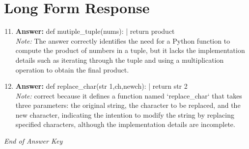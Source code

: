 \documentclass[12pt]{article}
\begin{document}
\section*{Long Form Response}
\begin{enumerate}[label=\arabic*.]
\setcounter{enumi}{10}
\item \textbf{Answer:} def mutiple\_tuple(nums): | return product
\\ \textit{Note:} The answer correctly identifies the need for a Python function to compute the product of numbers in a tuple, but it lacks the implementation details such as iterating through the tuple and using a multiplication operation to obtain the final product.
\item \textbf{Answer:} def replace\_char(str 1,ch,newch): | return str 2
\\ \textit{Note:} correct because it defines a function named `replace\_char` that takes three parameters: the original string, the character to be replaced, and the new character, indicating the intention to modify the string by replacing specified characters, although the implementation details are incomplete.
\end{enumerate}

\vfill
\noindent\textit{End of Answer Key}
\end{document}
